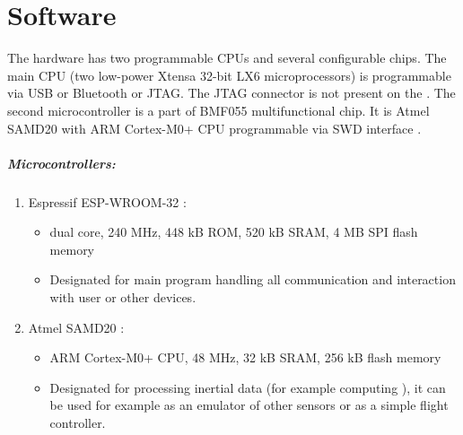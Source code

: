 \chapter{Software}
The  hardware has two programmable CPUs and several configurable chips. The main  CPU (two low-power Xtensa 32-bit LX6 microprocessors) \cite{espressif:ESP-WROOM-32} is programmable via USB or Bluetooth or \ac{JTAG}. The \ac{JTAG} connector is not present on the . The second microcontroller is a part of BMF055 \cite{bosch:BMF055} multifunctional chip. It is Atmel SAMD20 \cite{atmel:samd20} with ARM Cortex-M0+ CPU programmable via \ac{SWD} interface \cite{SWDinterface}.

\paragraph{Microcontrollers:}
\begin{enumerate}
    \item Espressif ESP-WROOM-32 \cite{espressif:ESP-WROOM-32}:
    \begin{itemize}
        \item dual core, 240 MHz, 448 kB ROM, 520 kB SRAM, 4 MB SPI flash memory
        \item Designated for main program handling all communication and interaction with user or other devices.
    \end{itemize}
    \item Atmel SAMD20 \cite{atmel:samd20}:
    \begin{itemize}
        \item ARM Cortex-M0+ CPU, 48 MHz, 32 kB SRAM, 256 kB flash memory
        \item Designated for processing inertial data (for example computing ), it can be used for example as an emulator of other sensors or as a simple flight controller.
    \end{itemize}
\end{enumerate}

